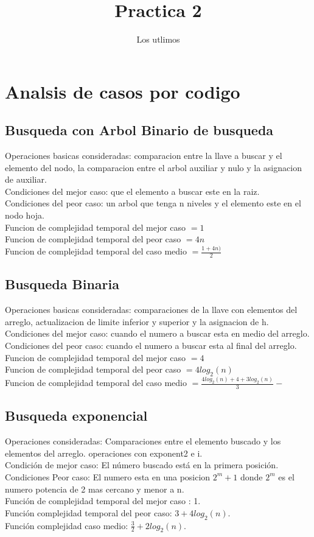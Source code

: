 \documentclass[12pt]{report}
\title{Practica 2}
\author{Los utlimos}
\begin{document}
\maketitle
\section*{Analsis de casos por codigo}
\subsection*{Busqueda con Arbol Binario de busqueda}
Operaciones basicas consideradas: comparacion entre la llave a buscar y el elemento del nodo, la comparacion entre el arbol auxiliar y nulo y la asignacion de auxiliar.\\
Condiciones del mejor caso: que el elemento a buscar este en la raiz.\\
Condiciones del peor caso: un arbol que tenga n niveles y el elemento este en el nodo hoja.\\
Funcion de complejidad temporal del mejor caso $= 1$\\
Funcion de complejidad temporal del peor caso $= 4n$\\
Funcion de complejidad temporal del caso medio $= \frac{1+4n)}{2}$
\subsection*{Busqueda Binaria}
Operaciones basicas consideradas: comparaciones de la llave con elementos del arreglo, actualizacion de limite inferior y superior y la asignacion de h.\\
Condiciones del mejor caso: cuando el numero a buscar esta en medio del arreglo.\\
Condiciones del peor caso: cuando el numero a buscar esta al final del arreglo.\\
Funcion de complejidad temporal del mejor caso $= 4$\\
Funcion de complejidad temporal del peor caso $= 4log_2(n)$\\
Funcion de complejidad temporal del caso medio $= \frac{4log_2(n) + 4 + 3log_2(n)}{3}-$
\subsection*{Busqueda exponencial}
Operaciones consideradas: Comparaciones entre el elemento buscado y los elementos del arreglo. operaciones con exponent2 e i.\\
Condición de mejor caso: El número buscado está en la primera posición. \\
Condiciones Peor caso: El numero esta en una posicion $2^m + 1$ donde $2^m$ es el numero potencia de 2 mas cercano y menor a n. \\
Función de complejidad temporal del mejor caso : 1.\\
Función complejidad temporal del peor caso: $3+4log_2(n)$. \\
Función complejidad caso medio: $\frac{3}{2}+2log_2(n)$.\\
\end{document}
